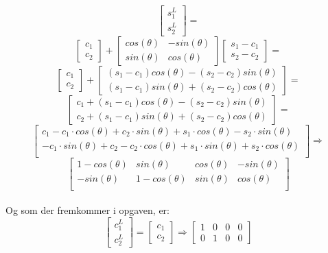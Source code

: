 \documentclass[a4paper,12pt]{article}
\begin{document}
\[
\left[\begin{array}{ccc}
    s^L_1\\
    s^L_2
\end{array}\right]
=
\]
\[
\left[\begin{array}{ccc}
    c_1\\
    c_2
\end{array}\right]
+
\left[\begin{array}{cc}
    cos(\theta) & -sin(\theta)\\
    sin(\theta) & cos(\theta)
\end{array}\right]
\left[\begin{array}{cc}
    s_1 -c_1\\
    s_2 -c_2
\end{array}\right]
=
\]
\[
\left[\begin{array}{ccc}
    c_1\\
    c_2
\end{array}\right]
+
\left[\begin{array}{c}
    (s_1-c_1)cos(\theta) - (s_2-c_2) sin(\theta) \\
    (s_1-c_1) sin(\theta) + (s_2-c_2) cos(\theta)
\end{array}\right]
=
\]
\[
\left[\begin{array}{c}
    c_1 +(s_1-c_1)cos(\theta) - (s_2-c_2) sin(\theta) \\
    c_2 + (s_1-c_1) sin(\theta) + (s_2-c_2) cos(\theta)
\end{array}\right]
=
\]
\[
\left[\begin{array}{cccc}
    c_1 - c_1\cdot cos(\theta) + c_2 \cdot sin(\theta) + s_1 \cdot cos(\theta) - s_2\cdot sin(\theta)\\
    -c_1\cdot sin(\theta) + c_2 - c_2 \cdot cos(\theta) + s_1 \cdot sin(\theta) + s_2\cdot cos(\theta)\\
\end{array}\right]
\Rightarrow
\]
\[
\left[\begin{array}{cccc}
    1 - cos(\theta) & sin(\theta) & cos(\theta) &  -sin(\theta)\\
    -sin(\theta) & 1 - cos(\theta) & sin(\theta) & cos(\theta)\\
\end{array}\right]
\]\\

Og som der fremkommer i opgaven, er:\\
\[
\left[\begin{array}{ccc}
    c^L_1\\
    c^L_2
\end{array}\right]
=
\left[\begin{array}{ccc}
    c_1\\
    c_2
\end{array}\right]
\Rightarrow
\left[\begin{array}{cccc}
    1 & 0 & 0 & 0\\
    0 & 1 & 0 & 0
\end{array}\right]
\]\\
\end{document}
